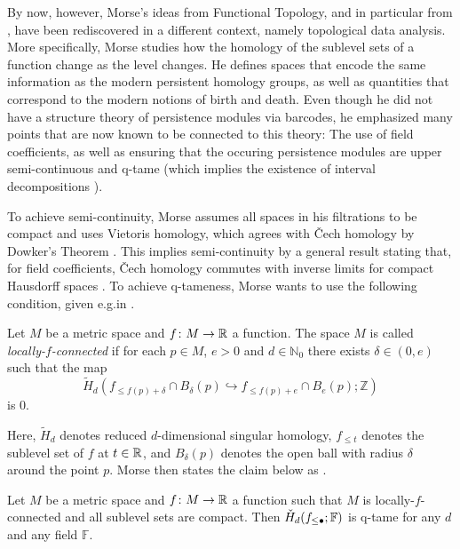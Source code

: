 By now, however, Morse's ideas from Functional Topology, and in particular from \cite{Morse.1940}, have been rediscovered in a different context, namely topological data analysis. More specifically, Morse studies how the homology of the sublevel sets of a function change as the level changes. He defines spaces that encode the same information as the modern persistent homology groups, as well as quantities that correspond to the modern notions of birth and death. Even though he did not have a structure theory of persistence modules via barcodes, he emphasized many points that are now known to be connected to this theory: The use of field coefficients, as well as ensuring that the occuring persistence modules are upper semi-continuous and q-tame (which implies the existence of interval decompositions \cite{schmahl2020structure}).

To achieve semi-continuity, Morse assumes all spaces in his filtrations to be compact and uses Vietoris homology, which agrees with \v{C}ech homology by Dowker's Theorem \cite{Dowker.1952}. This implies semi-continuity by a general result stating that, for field coefficients, \v{C}ech homology commutes with inverse limits for compact Hausdorff spaces \cite[Theorem VIII.3.6 and Theorem X.3.1]{MR0050886}. To achieve q-tameness, Morse wants to use the following condition, given e.g.\@ in \cite{Morse.1940}.

\begin{defi}
	Let $M$ be a metric space and $f \colon M \to \mathbb{R}$ a function. The space $M$ is called \emph{locally-$f$-connected} if for each $p\in M$, $e>0$ and $d\in\mathbb{N}_0$ there exists $\delta\in(0,e)$ such that the map 
	\[
	\tilde{H}_d(f_{\leq f(p)+\delta}\cap B_{\delta}(p)\hookrightarrow f_{\leq f(p)+e}\cap B_e(p);\mathbb{Z})
	\]
	is 0.
\end{defi}

Here, $\tilde{H}_{d}$ denotes reduced $d$-dimensional singular homology, $f_{\leq t}$ denotes the sublevel set of $f$ at $t\in\mathbb{R}$, and $B_{\delta}(p)$ denotes the open ball with radius $\delta$ around the point $p$.
Morse then states the claim below as \cite[Theorem 6.3]{Morse.1940}.

\begin{claim}
	Let $M$ be a metric space and $f\colon M\to\mathbb{R}$ a function such that $M$ is locally-$f$-connected and all sublevel sets are compact. Then $\check{H}_d(f_{\leq\bullet};\mathbb{F})$ is q-tame for any $d$ and any field $\mathbb{F}$.
\end{claim}

